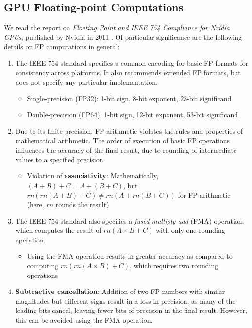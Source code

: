 \documentclass[12pt]{article}
\begin{document}
\subsection{GPU Floating-point Computations}
\label{subsection:gpu-floating-point}
We read the report on \textit{Floating Point and IEEE 754 Compliance for Nvidia GPUs}, published by Nvidia in 2011 \cite{floatingCompliance}. Of particular significance are the following details on FP computations in general:
\begin{enumerate}
    \item The IEEE 754 standard specifies a common encoding for basic FP formats for consistency across platforms. It also recommends extended FP formats, but does not specify any particular implementation.
    \begin{itemize}
        \item Single-precision (FP32): 1-bit sign, 8-bit exponent, 23-bit significand
        \item Double-precision (FP64): 1-bit sign, 12-bit exponent, 53-bit significand
    \end{itemize}
    \item Due to its finite precision, FP arithmetic violates the rules and properties of mathematical arithmetic. The order of execution of basic FP operations influences the accuracy of the final result, due to rounding of intermediate values to a specified precision.
    \begin{itemize}
        \item Violation of \textbf{associativity}: Mathematically, $(A + B) + C = A + (B + C)$, but $rn(rn(A + B) + C) \neq rn(A + rn(B + C))$ for FP arithmetic (here, $rn$ rounds the result)
    \end{itemize}
    \item The IEEE 754 standard also specifies a \textit{fused-multiply add} (FMA) operation, which computes the result of $rn(A \times B + C)$ with only one rounding operation.
    \begin{itemize}
        \item Using the FMA operation results in greater accuracy as compared to computing $rn(rn(A \times B) + C)$, which requires two rounding operations
    \end{itemize}
    \item \textbf{Subtractive cancellation}: Addition of two FP numbers with similar magnitudes but different signs result in a loss in precision, as many of the leading bits cancel, leaving fewer bits of precision in the final result. However, this can be avoided using the FMA operation.

\end{enumerate}
\end{document}
